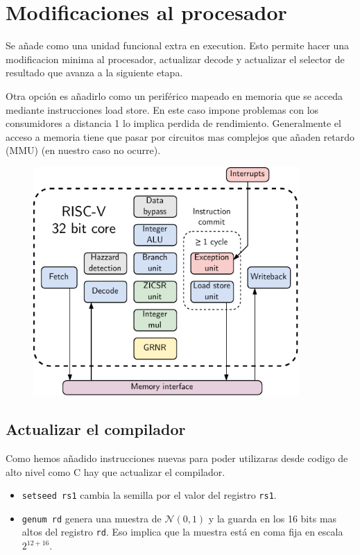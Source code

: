 \section{Modificaciones al procesador}
\todo

Se añade como una unidad funcional extra en execution. Esto permite hacer una modificacion minima al procesador, actualizar decode y actualizar el selector de resultado que avanza a la siguiente etapa.

Otra opción es añadirlo como un periférico mapeado en memoria que se acceda mediante instrucciones load store. En este caso impone problemas con los consumidores a distancia 1 lo implica perdida de rendimiento. Generalmente el acceso a memoria tiene que pasar por circuitos mas complejos que añaden retardo (MMU) (en nuestro caso no ocurre).

\begin{figure}[H]
    \centering
    \includegraphics[width=0.9\textwidth]{Imagenes/riscv_core_extended.pdf}
    \caption{\todo}
    \label{fig:bb}
\end{figure}


\subsection{Actualizar el compilador}
\todo

Como hemos añadido instrucciones nuevas para poder utilizaras desde codigo de alto nivel como C hay que actualizar el compilador.

\begin{itemize}
    \item \texttt{setseed rs1} cambia la semilla por el valor del registro \texttt{rs1}.
    \item \texttt{genum rd} genera una muestra de $\mathcal{N}(0,1)$ y la guarda en los 16 bits mas altos del registro \texttt{rd}. Eso implica que la muestra está en coma fija en escala $2^{12 + 16}$.
\end{itemize}

